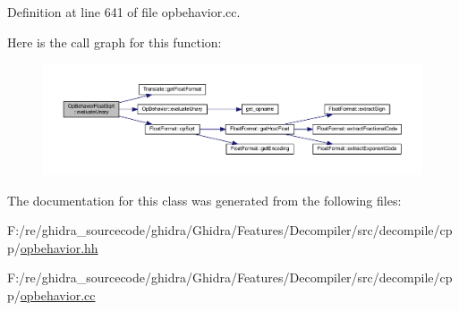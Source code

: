 Definition at line 641 of file opbehavior.\+cc.

Here is the call graph for this function\+:
\nopagebreak
\begin{figure}[H]
\begin{center}
\leavevmode
\includegraphics[width=350pt]{class_op_behavior_float_sqrt_ad27be9da5d1712e397f6b4374f05e3a1_cgraph}
\end{center}
\end{figure}


The documentation for this class was generated from the following files\+:\begin{DoxyCompactItemize}
\item 
F\+:/re/ghidra\+\_\+sourcecode/ghidra/\+Ghidra/\+Features/\+Decompiler/src/decompile/cpp/\mbox{\hyperlink{opbehavior_8hh}{opbehavior.\+hh}}\item 
F\+:/re/ghidra\+\_\+sourcecode/ghidra/\+Ghidra/\+Features/\+Decompiler/src/decompile/cpp/\mbox{\hyperlink{opbehavior_8cc}{opbehavior.\+cc}}\end{DoxyCompactItemize}
